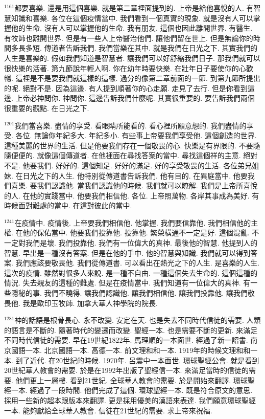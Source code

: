 \documentclass{book}
\begin{document}
$^{1161}$都要喜樂.
還是用這個喜樂.
就是第二章裡面提到的.
上帝是給他喜悅的人.
有智慧知識和喜樂.
各位在這個疫情當中.
我們看到一個真實的現象.
就是沒有人可以掌握他的生命.
沒有人可以掌握他的生命.
我有朋友.
這個也因此離開世界.
有醫生.
有牧師也離開世界.
但是有一些人上帝醫治他們.
讓他們留在世上.
但是無論你的時間多長多短.
傳道者告訴我們.
我們當樂在其中.
就是我們在日光之下.
其實我們的人生是喜樂的.
假如我們知道是智慧者.
讓我們可以好舒縮我們日子.
那我們就可以很快樂的活著.
第九節說年輕人啊.
你在幼年時要快樂.
在壯年日子要使你的心歡暢.
這裡是不是要我們就這樣的這樣.
過分的像第二章前面的一節.
到第九節所提出的呢.
絕對不是.
因為這邊.
有人提到順著你的心走願.
走見了去行.
但是你看到這邊.
上帝必神問你.
神問你.
這邊告訴我們什麼呢.
其實很重要的.
要告訴我們兩個很重要的觀點.
在日光之下.

$^{1201}$我們當喜樂.
盡情的享受.
看眼睛所能看的.
看心裡所願意想的.
我們盡情的享受.
各位.
無論你年紀多大.
年紀多小.
有些事上帝要我們享受他.
這個創造的世界.
這種美麗的世界的生活.
但是他要我們存在一個敬畏的心.
快樂是有界限的.
不要隨隨便便的.
就像這個傳道者.
在他裡面在尋找答案的當中.
尋找這個祥的主意.
絕對不是.
他要我們.
好好的.
這個知足.
好好的滿足.
好的享受敬畏的生活.
各位弟兄姐妹.
在日光之下的人生.
他特別從傳道書告訴我們.
他有目的.
在異庭當中.
他要我們喜樂.
要我們認識他.
當我們認識他的時候.
我們就可以瞭解.
我們是上帝所喜悅的人.
在他的實踐當中.
他要我們相信他.
各位.
上帝照萬物.
各岸其事成為美好.
有時候面對難處的當中.
在這對彼此的當中.

$^{1241}$在疫情中.
疫情後.
上帝要我們相信他.
他掌握.
我們要信靠他.
我們相信他的主權.
在他的保佑當中.
他要我們投靠他.
投靠他.
繁榮橫通不一定是好.
這個混亂.
不一定對我們是壞.
我們投靠他.
我們有一位偉大的真神.
最後他的智慧.
他提到人的智慧.
早出是一種沒有答案.
但是在他的手中.
他的智慧與知識.
我們就可以得到答案.
我們應該要敬畏他.
我們從傳道書.
可以看出在熱光之下的人生.
是喜樂的人生.
這次的疫情.
雖然對很多人來說.
是一種不自由.
一種這個失去生命的.
這個這種的情況.
失去親友的這種的難處.
但是在疫情當中.
我們知道有一位偉大的真神.
有一些隱秘的事.
我們不曉得.
讓我們認識他.
讓我們相信他.
讓我們投靠他.
讓我們敬畏他.
我是歐印玉牧師.
加拿大華人神學院的院長.

$^{1281}$神的話語是根骨長心.
永不改變.
安定在天.
也是失去不同時代信徒的需要.
人類的語言是不斷的.
隨著時代的變遷而改變.
聖經一本.
也是需要不斷的更新.
來滿足不同時代信徒的需要.
早在19世紀1822年.
馬理順的一本面世.
經過了新一詔書.
南京國語一本.
北京國語一本.
高德一本.
前文理和和一本.
1919年的時候文理和和一本.
到了近代.
在20世紀的時候.
1970年.
呂震中一本面世.
環球聖經公會.
就是看到20世紀華人教會的需要.
於是在1992年出版了聖經信一本.
來滿足當時的信徒的需要.
他們更上一層樓.
看到21世紀.
全球華人教會的需要.
於是開始來翻譯.
環球聖經一本.
經過了一段時間.
他們完成了這個.
環球聖經一本.
既是符合原文的意思.
採用一些新的超本跟版本來翻譯.
更是採用優美的漢語來表達.
我們願意環球聖經一本.
能夠獻給全球華人教會.
信徒在21世紀的需要.
求上帝來祝福.
\end{document}
